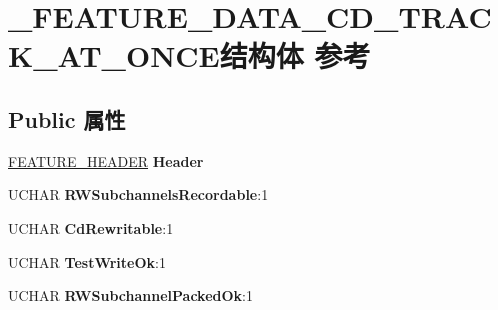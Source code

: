 \hypertarget{struct___f_e_a_t_u_r_e___d_a_t_a___c_d___t_r_a_c_k___a_t___o_n_c_e}{}\section{\+\_\+\+F\+E\+A\+T\+U\+R\+E\+\_\+\+D\+A\+T\+A\+\_\+\+C\+D\+\_\+\+T\+R\+A\+C\+K\+\_\+\+A\+T\+\_\+\+O\+N\+C\+E结构体 参考}
\label{struct___f_e_a_t_u_r_e___d_a_t_a___c_d___t_r_a_c_k___a_t___o_n_c_e}
\subsection*{Public 属性}
\begin{DoxyCompactItemize}
\item 
\mbox{\label{struct___f_e_a_t_u_r_e___d_a_t_a___c_d___t_r_a_c_k___a_t___o_n_c_e_a4cfc498441ba32290d7a3d4bd979678d}} 
\hyperlink{struct___f_e_a_t_u_r_e___h_e_a_d_e_r}{F\+E\+A\+T\+U\+R\+E\+\_\+\+H\+E\+A\+D\+ER} {\bfseries Header}
\item 
\mbox{\label{struct___f_e_a_t_u_r_e___d_a_t_a___c_d___t_r_a_c_k___a_t___o_n_c_e_a23eb24a2896a7c03bdfa06ed402a5080}} 
U\+C\+H\+AR {\bfseries R\+W\+Subchannels\+Recordable}\+:1
\item 
\mbox{\label{struct___f_e_a_t_u_r_e___d_a_t_a___c_d___t_r_a_c_k___a_t___o_n_c_e_ac694059dd3a6920a7f156bba6cd2cbe8}} 
U\+C\+H\+AR {\bfseries Cd\+Rewritable}\+:1
\item 
\mbox{\label{struct___f_e_a_t_u_r_e___d_a_t_a___c_d___t_r_a_c_k___a_t___o_n_c_e_ab5da7321adae90d73777becf9c1d1c9b}} 
U\+C\+H\+AR {\bfseries Test\+Write\+Ok}\+:1
\item 
\mbox{\label{struct___f_e_a_t_u_r_e___d_a_t_a___c_d___t_r_a_c_k___a_t___o_n_c_e_ad37517dc71871f72942e26d77c4ee641}} 
U\+C\+H\+AR {\bfseries R\+W\+Subchannel\+Packed\+Ok}\+:1

\end{DoxyCompactItemize}
